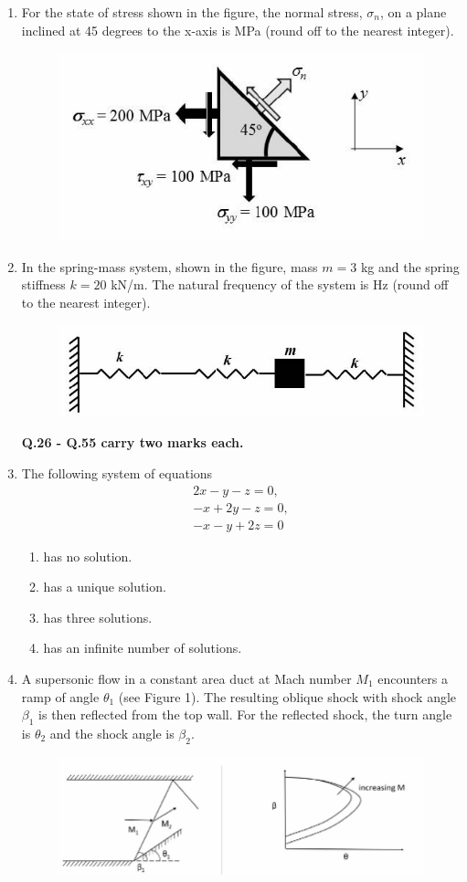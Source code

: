 \documentclass{article}
\begin{document}
\begin{enumerate}[leftmargin=*, resume]
\item For the state of stress shown in the figure, the normal stress, \(\sigma_n\), on a plane inclined at 45 degrees to the x-axis is \underline{\hspace{1.5cm}} MPa (round off to the nearest integer).
\begin{figure}[H]
    \centering
    \includegraphics[width=0.3\linewidth]{figs/q31.png}
    \caption{}
    \label{fig:q31}
\end{figure}

\item In the spring-mass system, shown in the figure, mass \( m = 3 \) kg and the spring stiffness \( k = 20 \) kN/m. The natural frequency of the system is \underline{\hspace{1.5cm}} Hz (round off to the nearest integer).
\begin{figure}[H]
    \centering
    \includegraphics[width=0.3\linewidth]{figs/q32.png}
    \caption{}
    \label{fig:q32}
\end{figure}

\textbf{Q.26 - Q.55 carry two marks each.}

\item The following system of equations
\begin{align}
    2x - y - z = 0,\\
-x + 2y - z = 0,\\
-x - y + 2z = 0
\end{align}

\begin{multicols}{4}
\begin{enumerate}
\item has no solution.
\item has a unique solution.
\item has three solutions.
\item has an infinite number of solutions.
\end{enumerate}
\end{multicols}

\item A supersonic flow in a constant area duct at Mach number \( M_1 \) encounters a ramp of angle \(\theta_1\) (see Figure 1). The resulting oblique shock with shock angle \(\beta_1\) is then reflected from the top wall. For the reflected shock, the turn angle is \(\theta_2\) and the shock angle is \(\beta_2\).
\begin{figure}[H]
    \centering
    \includegraphics[width=0.3\linewidth]{figs/q34.png}
    \caption{}
    \label{fig:q34}
\end{figure}


\end{enumerate}
\end{document}
